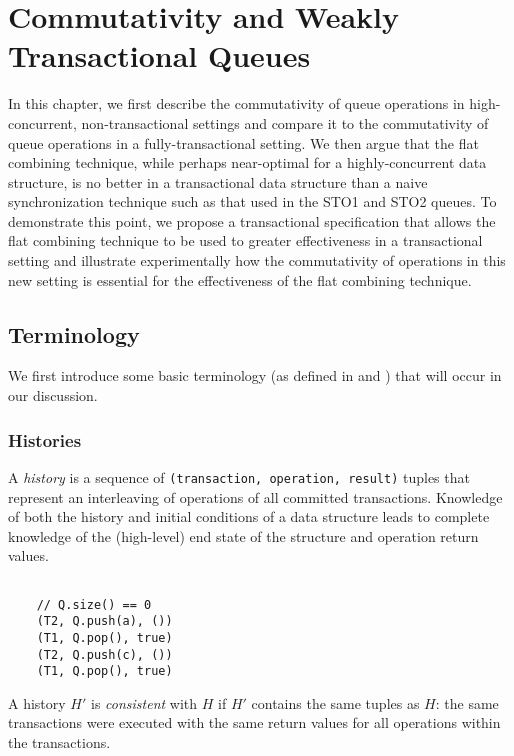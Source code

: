 \chapter{Commutativity and Weakly Transactional Queues}
\label{commutativity}

In this chapter, we first describe the commutativity of queue operations in high-concurrent, non-transactional settings and compare it to the commutativity of queue operations in a fully-transactional setting. We then argue that the flat combining technique, while perhaps near-optimal for a highly-concurrent data structure, is no better in a transactional data structure than a naive synchronization technique such as that used in the STO1 and STO2 queues. To demonstrate this point, we propose a transactional specification that allows the flat combining technique to be used to greater effectiveness in a transactional setting and illustrate experimentally how the commutativity of operations in this new setting is essential for the effectiveness of the flat combining technique.

\section{Terminology}
We first introduce some basic terminology (as defined in \cite{schwarz} and \cite{weihl}) that will occur in our discussion.

\subsection{Histories}
\begin{defn}
    A \emph{history} is a sequence of \texttt{(transaction, operation, result)} tuples that represent an interleaving of operations of all committed transactions. Knowledge of both the history and initial conditions of a data structure leads to complete knowledge of the (high-level) end state of the structure and operation return values.

\begin{eg}
    \begin{lstlisting}
   
    // Q.size() == 0 
    (T2, Q.push(a), ())
    (T1, Q.pop(), true)
    (T2, Q.push(c), ())
    (T1, Q.pop(), true)
    \end{lstlisting}
\end{eg}

\end{defn}

\begin{defn}
    A history $H'$ is \emph{consistent} with $H$ if $H'$ contains the same tuples as $H$: the same transactions were executed with the same return values for all operations within the transactions.
\end{defn}

